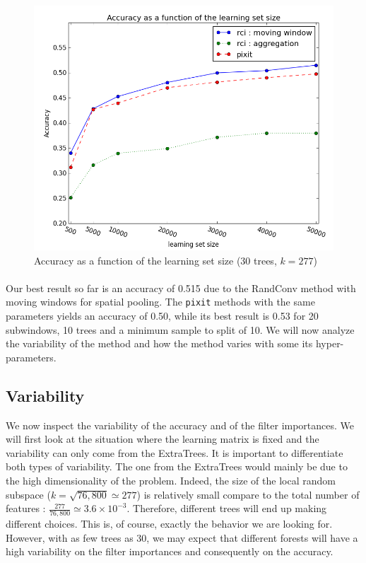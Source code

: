 \documentclass[a4paper]{report}
\begin{document}
		\begin{figure}
			\centering
				\includegraphics[width=1.0\textwidth]{images/accFLSsize.png}
			\caption{\label{fig:accFLSsize}Accuracy as a function of the learning set size (30 trees, $k=277$)}
		\end{figure}
		
		\paragraph{}
		Our best result so far is an accuracy of 0.515 due to the RandConv method with moving windows for spatial pooling. The \texttt{pixit} methods with the same parameters yields an accuracy of 0.50, while its best result is 0.53 for 20 subwindows, 10 trees and a minimum sample to split of 10. We will now analyze the variability of the method and how the method varies with some its hyper-parameters.
		
		\subsection{\label{subsec:ETDICVariability}Variability}
		We now inspect the variability of the accuracy and of the filter importances. We will first look at the situation where the learning matrix is fixed and the variability can only come from the ExtraTrees. It is important to differentiate both types of variability. The one from the ExtraTrees would mainly be due to the high dimensionality of the problem. Indeed, the size of the local random subspace ($k = \sqrt{76,800} \simeq 277$) is relatively small compare to the total number of features : $\frac{277}{76,800} \simeq 3.6 \times 10^{-3}$. Therefore, different trees will end up making different choices. This is, of course, exactly the behavior we are looking for. However, with as few trees as 30, we may expect that different forests will have a high variability on the filter importances and consequently on the accuracy.
		
\end{document}
